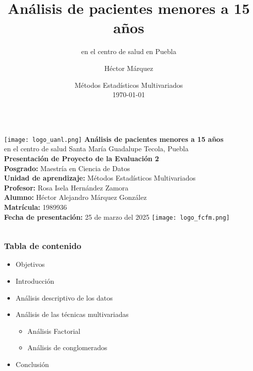\documentclass[
	11pt, %
]{beamer}
\title[Análisis de pacientes]{Análisis de pacientes menores a 15 años} %
\subtitle{en el centro de salud en Puebla} %
\author[Héctor Márquez]{Héctor Márquez} %
\institute[UANL]{Universidad Autónoma de Nuevo León\\ \smallskip \textit{hector.marquez@uanl.edu.mx}} %
\date[\today]{Métodos Estadísticos Multivariados \\ \today} %
\begin{document}

\begin{frame}
    \begin{columns}
            \texttt{[image: logo\_uanl.png]}
            \centering
            {\Large \textbf{Análisis de pacientes menores a 15 años}}\\[0.3cm]
            {\small en el centro de salud Santa María Guadalupe Tecola, Puebla}\\[0.5cm]
            {\normalsize \textbf{Presentación de Proyecto de la Evaluación 2}}\\[0.3cm]
            \textbf{Posgrado:} Maestría en Ciencia de Datos\\
            \textbf{Unidad de aprendizaje:} Métodos Estadísticos Multivariados\\[0.3cm]
            \textbf{Profesor:} Rosa Isela Hernández Zamora\\
            \textbf{Alumno:} Héctor Alejandro Márquez González\\
            \textbf{Matrícula:} 1989936\\[0.3cm]
            \textbf{Fecha de presentación:} 25 de marzo del 2025
            \texttt{[image: logo\_fcfm.png]}
    \end{columns}
\end{frame}



\begin{frame}
    \frametitle{Tabla de contenido} %
    \begin{itemize}
        \item Objetivos
        \item Introducción
        \item Análisis descriptivo de los datos
        \item Análisis de las técnicas multivariadas
        \begin{itemize}
        \item Análisis Factorial
        \item Análisis de conglomerados 
        \end{itemize}
        \item Conclusión
    \end{itemize}
\end{frame}
\end{document}
